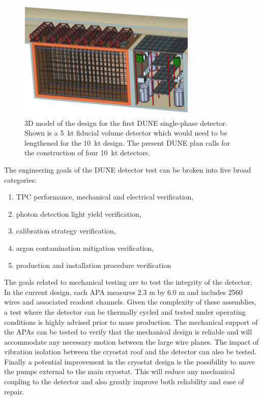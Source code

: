 \begin{figure}[!htb]
\centering
\begin{minipage}[b]{1.0\textwidth}
\begin{center}
\includegraphics[width=.75\textwidth]{figures/fardet-3D.png}
\end{center}
\end{minipage}
\caption{\small 3D model of the design for the first DUNE single-phase detector. Shown is a 5~kt fiducial volume detector which would need to be lengthened for the 10~kt design. The present DUNE plan calls for the construction of four 10~kt detectors. }
\label{fig:fardet-overview} 
\end{figure}

The engineering goals of the DUNE detector test can be broken into five broad categories: 
\begin{enumerate}
	\item TPC performance, mechanical and electrical verification, 
	\item photon detection light yield verification,
	\item calibration strategy verification,
	\item argon contamination mitigation verification, 
	\item production and installation procedure verification
\end{enumerate}

	 The goals related to mechanical testing are to test the integrity of the detector. In the current design, each APA measures 2.3 m by 6.0 m and includes 2560 wires and associated readout channels. Given the complexity of these assemblies, a test where the detector can be thermally cycled and tested under operating conditions is highly advised prior to mass production. The mechanical support of the APAs can be tested to verify that the mechanical design is reliable and will accommodate any necessary motion between the large wire planes. The impact of vibration isolation between the cryostat roof and the detector can also be tested. Finally a potential improvement in the cryostat design is the possibility to move the pumps external to the main cryostat. This will reduce any mechanical coupling to the detector and also greatly improve both reliability and ease of repair. \\

